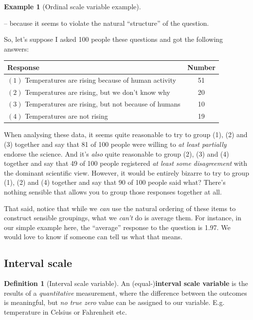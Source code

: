 \documentclass[
  11pt,
]{book}
\theoremstyle{definition}
\newtheorem{definition}{Definition}[chapter]
\theoremstyle{definition}
\newtheorem{example}{Example}[chapter]
\theoremstyle{definition}
\theoremstyle{definition}
\theoremstyle{remark}
\begin{document}
\begin{example}[Ordinal scale variable example]
\begin{keepTogether}
\end{keepTogether}

-- because it seems to violate the natural ``structure'' of the question.

So, let's suppose I asked 100 people these questions and got the following answers:

\begin{table}[H]
\centering
\begin{tabular}{lc}
\toprule
Response & Number\\
\midrule
$(1)$ Temperatures are rising because of human activity & 51\\
$(2)$ Temperatures are rising, but we don't know why & 20\\
$(3)$ Temperatures are rising, but not because of humans & 10\\
$(4)$ Temperatures are not rising & 19\\
\bottomrule
\end{tabular}
\end{table}

When analysing these data, it seems quite reasonable to try to group (1), (2) and (3) together and say that 81 of 100 people were willing to \emph{at least partially} endorse the science. And it's \emph{also} quite reasonable to group (2), (3) and (4) together and say that 49 of 100 people registered \emph{at least some disagreement} with the dominant scientific view. However, it would be entirely bizarre to try to group (1), (2) and (4) together and say that 90 of 100 people said what? There's nothing sensible that allows you to group those responses together at all.

That said, notice that while we \emph{can} use the natural ordering of these items to construct sensible groupings, what we \emph{can't} do is average them. For instance, in our simple example here, the ``average'' response to the question is 1.97. We would love to know if someone can tell us what that means.
\end{example}

\hypertarget{intervalscale}{%
\subsection{Interval scale}\label{intervalscale}}

\begin{definition}[Interval scale variable]
\protect\hypertarget{def:definterval}{}\label{def:definterval}An (equal-)\textbf{interval scale variable} is the results of a \emph{quantitative} measurement, where the difference between the outcomes is meaningful, but \emph{no true zero} value can be assigned to our variable. E.g. temperature in Celsius or Fahrenheit etc.
\end{definition}
\end{document}
